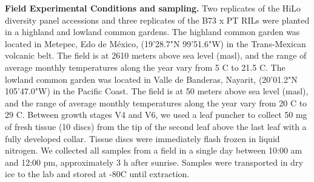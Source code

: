 \documentclass[9pt,twocolumn,twoside,lineno]{BioRxiv}
\begin{document}
\textbf{Field Experimental Conditions and sampling.} 
Two replicates of the HiLo diversity panel accessions and three replicates of the B73 x PT RILs were planted in a highland and lowland common gardens. 
The highland common garden was located in Metepec, Edo de México, (19'28.7"N 99'51.6"W) in the Trans-Mexican volcanic belt. 
The field is at 2610 meters above sea level (masl), and the range of average monthly temperatures along the year vary from 5 \degree C to 21.5 \degree C.  
The lowland common garden was located in Valle de Banderas, Nayarit, (20'01.2"N 105'47.0"W) in the Pacific Coast. 
The field is at 50 meters above sea level (masl), and the range of average monthly temperatures along the year vary from 20 \degree C to 29 \degree C.
Between growth stages V4 and V6, we used a leaf puncher to collect 50 mg of fresh tissue (10 discs) from the tip of the second leaf above the last leaf with a fully developed collar. 
Tissue discs were immediately flash frozen in liquid nitrogen. 
We collected all samples from a field in a single day between 10:00 am and 12:00 pm, approximately 3 h after sunrise. Samples were transported in dry ice to the lab and stored at -80\degree C until extraction. 
\end{document}
